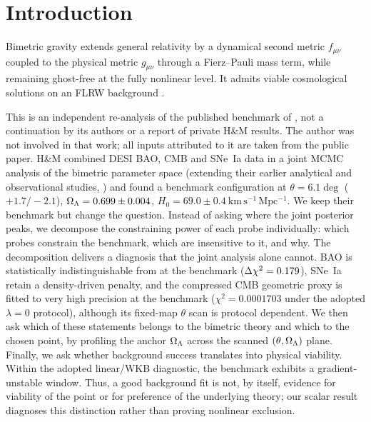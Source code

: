 \section{Introduction}\label{sec:intro}

Bimetric gravity \citep{Hassan2012} extends general relativity by a dynamical second metric $f_{\mu\nu}$ coupled to the physical metric $g_{\mu\nu}$ through a Fierz--Pauli mass term, while remaining ghost-free at the fully nonlinear level. It admits viable cosmological solutions on an FLRW background \citep{vonStrauss2012,Comelli2012,Bassi2023}.

This is an independent re-analysis of the published benchmark of \citet[][H\&M]{Hogas2025}, not a continuation by its authors or a report of private H\&M results. The author was not involved in that work; all inputs attributed to it are taken from the public paper. H\&M combined DESI BAO, CMB and SNe~Ia data in a joint MCMC analysis of the bimetric parameter space (extending their earlier analytical and observational studies, \citealp{Hogas2021,Hogas2021b}) and found a benchmark configuration at $\theta=6.1\deg$ ($+1.7/-2.1$), $\Omega_{\Lambda}=0.699\pm0.004$, $H_0=69.0\pm0.4\ \mathrm{km\,s^{-1}\,Mpc^{-1}}$.
We keep their benchmark but change the question. Instead of asking where the joint posterior peaks, we decompose the constraining power of each probe individually: which probes constrain the benchmark, which are insensitive to it, and why.
The decomposition delivers a diagnosis that the joint analysis alone cannot. BAO is statistically indistinguishable from \LCDM{} at the benchmark ($\Delta\chi^2=0.179$), SNe~Ia retain a density-driven penalty, and the compressed CMB geometric proxy is fitted to very high precision at the benchmark ($\chi^2=0.0001703$ under the adopted $\lambda=0$ protocol), although its fixed-map $\theta$ scan is protocol dependent. We then ask which of these statements belongs to the bimetric theory and which to the chosen point, by profiling the anchor $\Omega_{\Lambda}$ across the scanned $(\theta,\Omega_{\Lambda})$ plane. Finally, we ask whether background success translates into physical viability. Within the adopted linear/WKB diagnostic, the benchmark exhibits a gradient-unstable window. Thus, a good background fit is not, by itself, evidence for viability of the point or for preference of the underlying theory; our scalar result diagnoses this distinction rather than proving nonlinear exclusion.

